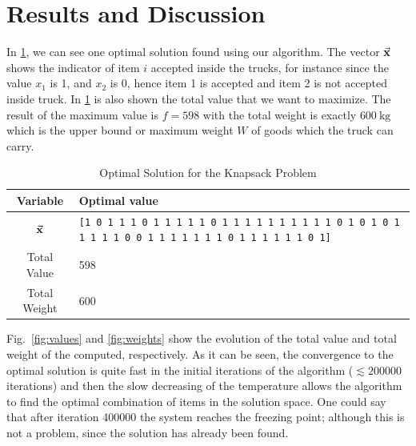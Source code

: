 \section{Results and Discussion}

In \cref{tab:result}, we can see one optimal solution found using our algorithm. The vector $\va{x}$  shows the indicator of item $i$ accepted inside the trucks, for instance since the value $x_1$ is \num{1}, and $x_2$ is \num{0}, hence item 1 is accepted and item 2 is not accepted inside truck. In \cref{tab:result} is also shown the total value that we want to maximize. The result of the maximum value is $f = 598$ with the total weight is exactly $\SI{600}{\kg}$ which is the upper bound or maximum weight $W$ of goods which the truck can carry.

\begin{table}[H]
    \centering
    \begin{tabularx}{0.9\textwidth}{c X}
        \toprule
        \toprule
        Variable & Optimal value \\
        \midrule
        $\va{x}$     & \texttt{[1 0 1 1 1 0 1 1 1 1 1 0 1 1 1 1 1 1 1 1 1 1 0 1 0 1 0 1 1 1 1 1 0 0 1 1 1 1 1 1 1 0 1 1 1 1 1 1 0 1]} \\
        Total Value  & 598 \\
        Total Weight & 600 \\
        \bottomrule
    \end{tabularx}
    \caption{Optimal Solution for the Knapsack Problem}
    \label{tab:result}
\end{table}

Fig.~\ref{fig:values} and \cref{fig:weights} show the evolution of the total value and total weight of the computed, respectively. As it can be seen, the convergence to the optimal solution is quite fast in the initial iterations of the algorithm ($\lesssim \num{200000}$ iterations) and then the slow decreasing of the temperature allows the algorithm to find the optimal combination of items in the solution space. One could say that after iteration \num{400000} the system reaches the freezing point; although this is not a problem, since the solution has already been found.

